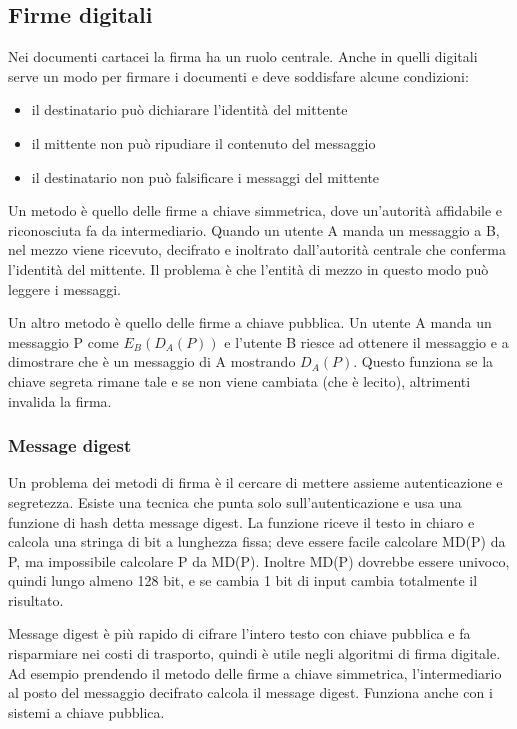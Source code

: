 \subsection{Firme digitali} %
Nei documenti cartacei la firma ha un ruolo centrale. 
Anche in quelli digitali serve un modo per firmare i documenti e deve soddisfare alcune condizioni:
\begin{itemize}
\item il destinatario può dichiarare l'identità del mittente
\item il mittente non può ripudiare il contenuto del messaggio
\item il destinatario non può falsificare i messaggi del mittente
\end{itemize}
Un metodo è quello delle firme a chiave simmetrica, dove un'autorità affidabile e riconosciuta fa da intermediario.
Quando un utente A manda un messaggio a B, nel mezzo viene ricevuto, decifrato e inoltrato dall'autorità centrale che conferma l'identità del mittente.
Il problema è che l'entità di mezzo in questo modo può leggere i messaggi.

Un altro metodo è quello delle firme a chiave pubblica. 
Un utente A manda un messaggio P come $E_B(D_A(P))$ e l'utente B riesce ad ottenere il messaggio e a dimostrare che è un messaggio di A mostrando $D_A(P)$.
Questo funziona se la chiave segreta rimane tale e se non viene cambiata (che è lecito), altrimenti invalida la firma.

\subsubsection{Message digest} %
Un problema dei metodi di firma è il cercare di mettere assieme autenticazione e segretezza.
Esiste una tecnica che punta solo sull'autenticazione e usa una funzione di hash detta message digest. 
La funzione riceve il testo in chiaro e calcola una stringa di bit a lunghezza fissa;
deve essere facile calcolare MD(P) da P, ma impossibile calcolare P da MD(P).
Inoltre MD(P) dovrebbe essere univoco, quindi lungo almeno 128 bit, e se cambia 1 bit di input cambia totalmente il risultato.

Message digest è più rapido di cifrare l'intero testo con chiave pubblica e fa risparmiare nei costi di trasporto,
quindi è utile negli algoritmi di firma digitale.
Ad esempio prendendo il metodo delle firme a chiave simmetrica, l'intermediario al posto del messaggio decifrato calcola il message digest. 
Funziona anche con i sistemi a chiave pubblica.

